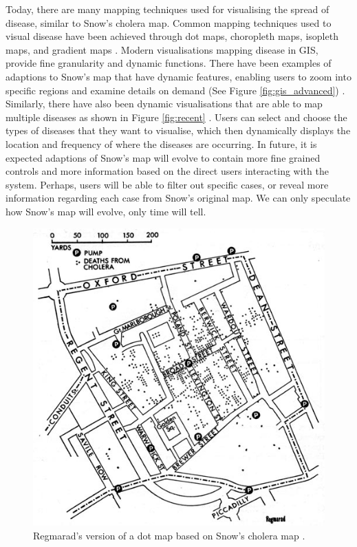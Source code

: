 \documentclass[12pt]{article}
\begin{document}
Today, there are many mapping techniques used for visualising the spread of disease, similar to Snow's cholera map. Common mapping techniques used to visual disease have been achieved through dot maps, choropleth maps, isopleth maps, and gradient maps \cite{recent}. Modern visualisations mapping disease in GIS, provide fine granularity and dynamic functions. There have been examples of adaptions to Snow's map that have dynamic features, enabling users to zoom into specific regions and examine details on demand (See Figure \ref{fig:gis_advanced}) \cite{advanced}. Similarly, there have also been dynamic visualisations that are able to map multiple diseases as shown in Figure \ref{fig:recent} \cite{recent}. Users can select and choose the types of diseases that they want to visualise, which then dynamically displays the location and frequency of where the diseases are occurring. In future, it is expected adaptions of Snow's map will evolve to contain more fine grained controls and more information based on the direct users interacting with the system. Perhaps, users will be able to filter out specific cases, or reveal more information regarding each case from Snow's original map. We can only speculate how Snow's map will evolve, only time will tell. 

\begin{figure}
\centering
\includegraphics[scale=15.0]{images/snowmap1_regmarad}
\caption{Regmarad's version of a dot map based on Snow's cholera map \cite{ralph}.
}
\label{fig:reg}
\end{figure}
\end{document}
